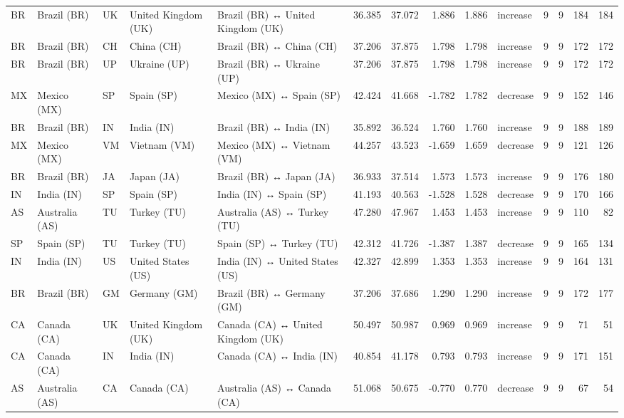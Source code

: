 \begin{tabular}{lllllrrrrlrrrr}
BR & Brazil (BR) & UK & United Kingdom (UK) & Brazil (BR) ↔ United Kingdom (UK) & 36.385 & 37.072 & 1.886 & 1.886 & increase & 9 & 9 & 184 & 184 \\
BR & Brazil (BR) & CH & China (CH) & Brazil (BR) ↔ China (CH) & 37.206 & 37.875 & 1.798 & 1.798 & increase & 9 & 9 & 172 & 172 \\
BR & Brazil (BR) & UP & Ukraine (UP) & Brazil (BR) ↔ Ukraine (UP) & 37.206 & 37.875 & 1.798 & 1.798 & increase & 9 & 9 & 172 & 172 \\
MX & Mexico (MX) & SP & Spain (SP) & Mexico (MX) ↔ Spain (SP) & 42.424 & 41.668 & -1.782 & 1.782 & decrease & 9 & 9 & 152 & 146 \\
BR & Brazil (BR) & IN & India (IN) & Brazil (BR) ↔ India (IN) & 35.892 & 36.524 & 1.760 & 1.760 & increase & 9 & 9 & 188 & 189 \\
MX & Mexico (MX) & VM & Vietnam (VM) & Mexico (MX) ↔ Vietnam (VM) & 44.257 & 43.523 & -1.659 & 1.659 & decrease & 9 & 9 & 121 & 126 \\
BR & Brazil (BR) & JA & Japan (JA) & Brazil (BR) ↔ Japan (JA) & 36.933 & 37.514 & 1.573 & 1.573 & increase & 9 & 9 & 176 & 180 \\
IN & India (IN) & SP & Spain (SP) & India (IN) ↔ Spain (SP) & 41.193 & 40.563 & -1.528 & 1.528 & decrease & 9 & 9 & 170 & 166 \\
AS & Australia (AS) & TU & Turkey (TU) & Australia (AS) ↔ Turkey (TU) & 47.280 & 47.967 & 1.453 & 1.453 & increase & 9 & 9 & 110 & 82 \\
SP & Spain (SP) & TU & Turkey (TU) & Spain (SP) ↔ Turkey (TU) & 42.312 & 41.726 & -1.387 & 1.387 & decrease & 9 & 9 & 165 & 134 \\
IN & India (IN) & US & United States (US) & India (IN) ↔ United States (US) & 42.327 & 42.899 & 1.353 & 1.353 & increase & 9 & 9 & 164 & 131 \\
BR & Brazil (BR) & GM & Germany (GM) & Brazil (BR) ↔ Germany (GM) & 37.206 & 37.686 & 1.290 & 1.290 & increase & 9 & 9 & 172 & 177 \\
CA & Canada (CA) & UK & United Kingdom (UK) & Canada (CA) ↔ United Kingdom (UK) & 50.497 & 50.987 & 0.969 & 0.969 & increase & 9 & 9 & 71 & 51 \\
CA & Canada (CA) & IN & India (IN) & Canada (CA) ↔ India (IN) & 40.854 & 41.178 & 0.793 & 0.793 & increase & 9 & 9 & 171 & 151 \\
AS & Australia (AS) & CA & Canada (CA) & Australia (AS) ↔ Canada (CA) & 51.068 & 50.675 & -0.770 & 0.770 & decrease & 9 & 9 & 67 & 54 \\

\end{tabular}
